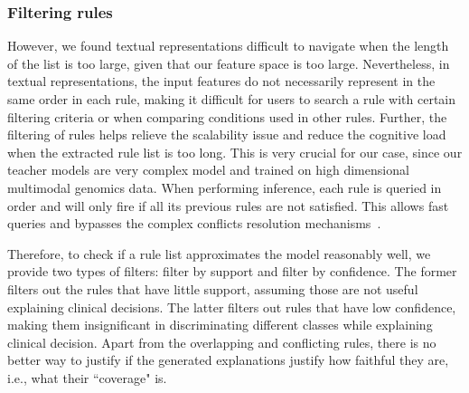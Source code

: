 \subsubsection{Filtering rules}
However, we found textual representations difficult to navigate when the length of the list is too large, given that our feature space is too large. Nevertheless, in textual representations, the input features do not necessarily represent in the same order in each rule, making it  difficult for users to search a rule with certain filtering criteria or when comparing conditions used in other rules. 
Further, the filtering of rules helps relieve the scalability issue and reduce the cognitive load when the extracted rule list is too long. This is very crucial for our case, since our teacher models are very complex model and trained on high dimensional multimodal genomics data. 
When performing inference, each rule is queried in order and will only fire if all its previous rules are not satisfied. This allows fast queries and bypasses the complex conflicts resolution mechanisms~\cite{ribeiro2018anchors}.

\hspace*{3.5mm} Therefore, to check if a rule list approximates the model reasonably well, we provide two types of filters: filter by support and filter by confidence. The former filters out the rules that have little support, assuming those are not useful explaining clinical decisions. The latter filters out rules that have low confidence, making them insignificant in discriminating different classes while explaining clinical decision. Apart from the overlapping and conflicting rules, there is no better way to justify if the generated explanations justify how faithful they are, i.e., what their ``coverage" is. 



